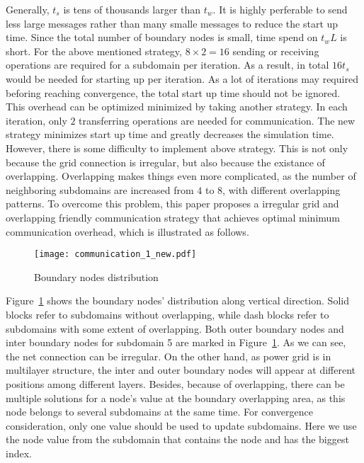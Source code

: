 \documentclass{sig-alternate}
\begin{document}
	Generally, $t_s$ is tens of thousands larger than $t_w$. It is highly perferable to send less 
	large messages rather than many smalle messages to reduce the start up time. Since the total number of boundary nodes is small, 
	time spend on $t_wL$ is short. For the above mentioned strategy, $8\times 2 = 
	16$ sending or receiving operations are required for a subdomain per iteration. As a result, in total $16t_s$ 
	would be needed for starting up per iteration. As a lot of iterations may required beforing reaching convergence, the total 
	start up time should not be ignored. This overhead can be optimized minimized by taking another strategy.
	In each iteration, only $2$ transferring operations are needed for communication. The new strategy minimizes start up time and 
	greatly decreases the simulation time. However, there is some difficulty to implement above strategy. This is not only because
	the grid connection is irregular, but also because the existance of overlapping. Overlapping makes things even more complicated, 
	as the number of neighboring subdomains are increased from $4$ to $8$, with different overlapping patterns. To overcome this 
	problem, this paper proposes a irregular grid and overlapping friendly communication strategy that achieves optimal 
	minimum communication overhead, which is illustrated as follows.\\

	\begin{figure}[htbp]
	  \centering
	  \texttt{[image: communication\_1\_new.pdf]}
	  \caption{Boundary nodes distribution}
	  \label{comm}
	\end{figure}

	Figure~\ref{comm} shows the boundary nodes' distribution along vertical direction. Solid blocks refer to subdomains without 
	overlapping, while dash blocks refer to subdomains with some extent of overlapping. Both outer boundary nodes and inter
	boundary nodes for subdomain 5 are marked in Figure~\ref{comm}. As we can see, the net connection can be irregular. On the
	other hand, as power grid is in multilayer structure, the inter and outer boundary nodes will appear at different positions
	among different layers. Besides, because of overlapping, there can be multiple solutions for a node's value at the boundary 
	overlapping area, as this node belongs to several subdomains at the same time. For convergence consideration, only one value 
	should be used to update subdomains. Here we use the node value from the subdomain that contains the node and has the biggest 
	index.\\
\end{document}
